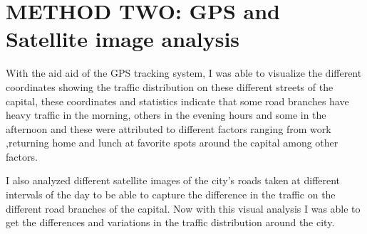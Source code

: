 \documentclass[a4paper,12pt]{article}
\begin{document}
\section{METHOD TWO: GPS and Satellite image analysis}                                                                                                                                                                                    
    
With the aid aid of the GPS tracking system, I was able to visualize the different coordinates showing the traffic distribution on these different streets of the capital,  these coordinates and statistics indicate  that some road branches have heavy traffic in the morning, others in the evening hours and some in the afternoon and these were attributed to different factors ranging from work ,returning home and lunch at favorite spots around the capital among other factors.

I also analyzed different satellite images of the city’s roads taken at different intervals of the day to be able to capture the difference in the traffic on the different road branches of the capital. Now with this visual analysis I was able to get the differences and variations in the traffic distribution around the city.
\end{document}
